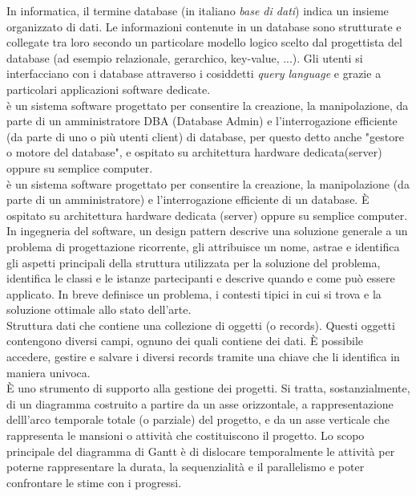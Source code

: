 \documentclass{scalatekids-article}
\begin{document}

 In informatica, il termine database (in italiano \textit{base di dati}) indica un insieme organizzato di dati.
Le informazioni contenute in un database sono strutturate e collegate tra loro secondo un particolare modello logico scelto dal progettista del database (ad esempio relazionale, gerarchico, key-value, ...).
Gli utenti si interfacciano con i database attraverso i cosiddetti \textit{query language} e grazie a particolari applicazioni software dedicate.
\\

 è un sistema software progettato per consentire la creazione, la manipolazione, da parte di un amministratore DBA (Database Admin) e l'interrogazione efficiente (da parte di uno o più utenti client) di database, per questo detto anche "gestore o motore del database", e ospitato su architettura hardware dedicata(server) oppure su semplice computer.
\\

 è un sistema software progettato per consentire la creazione, la manipolazione (da parte di un amministratore) e l'interrogazione efficiente di un database.
È ospitato su architettura hardware dedicata (server) oppure su semplice computer.
\\

 In ingegneria del software, un design pattern descrive una soluzione generale a un problema di progettazione ricorrente, gli attribuisce un nome, astrae e identifica gli aspetti principali della struttura utilizzata per la soluzione del problema, identifica le classi e le istanze partecipanti e descrive quando e come può essere applicato. In breve definisce un problema, i contesti tipici in cui si trova e la soluzione ottimale allo stato dell'arte.
\\

 Struttura dati che contiene una collezione di oggetti (o records).
Questi oggetti contengono diversi campi, ognuno dei quali contiene dei dati.
È possibile accedere, gestire e salvare i diversi records tramite una chiave che li identifica in maniera univoca.
\\

 È uno strumento di supporto alla gestione dei progetti.
Si tratta, sostanzialmente, di un diagramma costruito a partire da un asse orizzontale, a rappresentazione delll'arco temporale totale (o parziale) del progetto, e da un asse verticale che rappresenta le mansioni o attività che costituiscono il progetto.
Lo scopo principale del diagramma di Gantt è di dislocare temporalmente le attività per poterne rappresentare la durata, la sequenzialità e il parallelismo e poter confrontare le stime con i progressi.
\\
\end{document}
